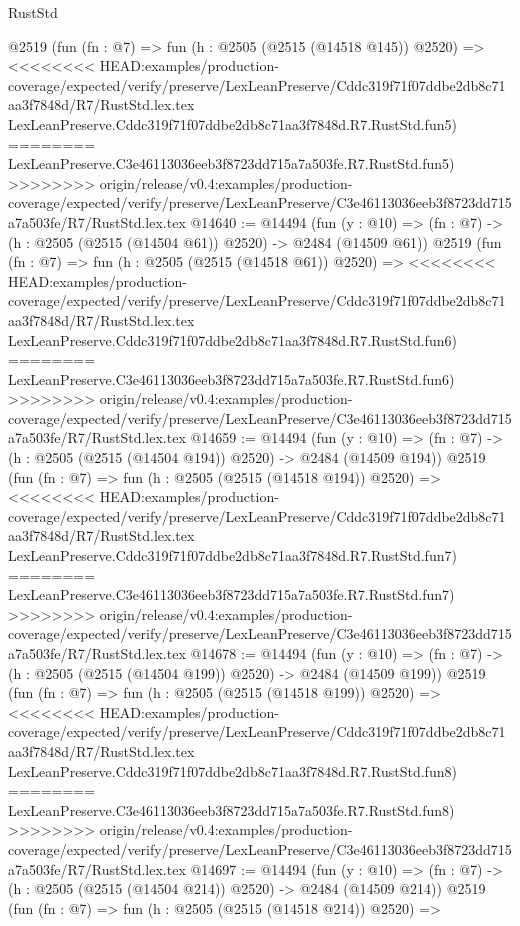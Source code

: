 \begin{lexlean}{RustStd}
\begin{coremodule}
{\begin{coremodule}
{{{{{{{{{{{{{{{{{{{{    @2519
    (fun (fn : @7) =>
    fun (h : @2505 (@2515 (@14518 @145)) @2520) =>
<<<<<<<< HEAD:examples/production-coverage/expected/verify/preserve/LexLeanPreserve/Cddc319f71f07ddbe2db8c71aa3f7848d/R7/RustStd.lex.tex
    LexLeanPreserve.Cddc319f71f07ddbe2db8c71aa3f7848d.R7.RustStd.fun5)
========
    LexLeanPreserve.C3e46113036eeb3f8723dd715a7a503fe.R7.RustStd.fun5)
>>>>>>>> origin/release/v0.4:examples/production-coverage/expected/verify/preserve/LexLeanPreserve/C3e46113036eeb3f8723dd715a7a503fe/R7/RustStd.lex.tex
@14640 := @14494
    (fun (y : @10) => (fn : @7) -> (h : @2505 (@2515 (@14504 @61)) @2520) -> @2484 (@14509 @61))
    @2519
    (fun (fn : @7) =>
    fun (h : @2505 (@2515 (@14518 @61)) @2520) =>
<<<<<<<< HEAD:examples/production-coverage/expected/verify/preserve/LexLeanPreserve/Cddc319f71f07ddbe2db8c71aa3f7848d/R7/RustStd.lex.tex
    LexLeanPreserve.Cddc319f71f07ddbe2db8c71aa3f7848d.R7.RustStd.fun6)
========
    LexLeanPreserve.C3e46113036eeb3f8723dd715a7a503fe.R7.RustStd.fun6)
>>>>>>>> origin/release/v0.4:examples/production-coverage/expected/verify/preserve/LexLeanPreserve/C3e46113036eeb3f8723dd715a7a503fe/R7/RustStd.lex.tex
@14659 := @14494
    (fun (y : @10) => (fn : @7) -> (h : @2505 (@2515 (@14504 @194)) @2520) -> @2484 (@14509 @194))
    @2519
    (fun (fn : @7) =>
    fun (h : @2505 (@2515 (@14518 @194)) @2520) =>
<<<<<<<< HEAD:examples/production-coverage/expected/verify/preserve/LexLeanPreserve/Cddc319f71f07ddbe2db8c71aa3f7848d/R7/RustStd.lex.tex
    LexLeanPreserve.Cddc319f71f07ddbe2db8c71aa3f7848d.R7.RustStd.fun7)
========
    LexLeanPreserve.C3e46113036eeb3f8723dd715a7a503fe.R7.RustStd.fun7)
>>>>>>>> origin/release/v0.4:examples/production-coverage/expected/verify/preserve/LexLeanPreserve/C3e46113036eeb3f8723dd715a7a503fe/R7/RustStd.lex.tex
@14678 := @14494
    (fun (y : @10) => (fn : @7) -> (h : @2505 (@2515 (@14504 @199)) @2520) -> @2484 (@14509 @199))
    @2519
    (fun (fn : @7) =>
    fun (h : @2505 (@2515 (@14518 @199)) @2520) =>
<<<<<<<< HEAD:examples/production-coverage/expected/verify/preserve/LexLeanPreserve/Cddc319f71f07ddbe2db8c71aa3f7848d/R7/RustStd.lex.tex
    LexLeanPreserve.Cddc319f71f07ddbe2db8c71aa3f7848d.R7.RustStd.fun8)
========
    LexLeanPreserve.C3e46113036eeb3f8723dd715a7a503fe.R7.RustStd.fun8)
>>>>>>>> origin/release/v0.4:examples/production-coverage/expected/verify/preserve/LexLeanPreserve/C3e46113036eeb3f8723dd715a7a503fe/R7/RustStd.lex.tex
@14697 := @14494
    (fun (y : @10) => (fn : @7) -> (h : @2505 (@2515 (@14504 @214)) @2520) -> @2484 (@14509 @214))
    @2519
    (fun (fn : @7) =>
    fun (h : @2505 (@2515 (@14518 @214)) @2520) =>
}}}}}}}}}}}}}}}}}}}}
\end{coremodule}}
\end{coremodule}
\end{lexlean}
